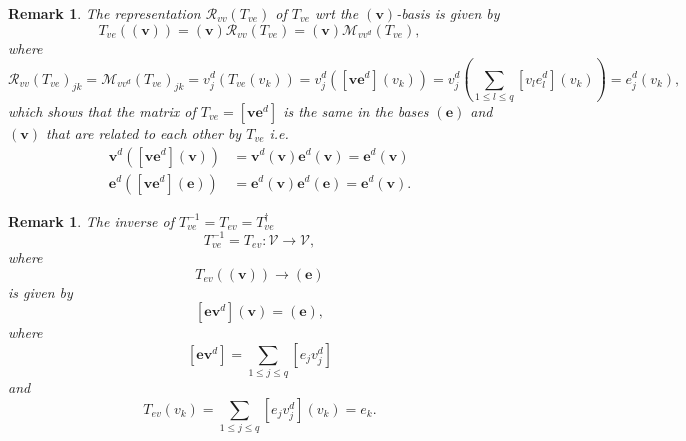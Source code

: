 \documentclass[aps,preprint]{revtex4}%
\newtheorem{remark}[theorem]{Remark}
\begin{document}
\begin{remark}
The representation $\mathcal{R}_{vv}\left(  T_{ve}\right)  $ of $T_{ve}$ wrt
the $\left(  \boldsymbol{v}\right)  $-basis is given by
\begin{equation}
T_{ve}\left(  \left(  \boldsymbol{v}\right)  \right)  =\left(  \boldsymbol{v}%
\right)  \mathcal{R}_{vv}\left(  T_{ve}\right)  =\left(  \boldsymbol{v}%
\right)  \mathcal{M}_{vv^{d}}\left(  T_{ve}\right)  ,
\end{equation}
where
\begin{equation}
\mathcal{R}_{vv}\left(  T_{ve}\right)  _{jk}=\mathcal{M}_{vv^{d}}\left(
T_{ve}\right)  _{jk}=v_{j}^{d}\left(  T_{ve}\left(  v_{k}\right)  \right)
=v_{j}^{d}\left(  \left[  \boldsymbol{v}\mathbf{e}^{d}\right]  \left(
v_{k}\right)  \right)  =v_{j}^{d}\left(  \sum_{1\leq l\leq q}\left[
v_{l}e_{l}^{d}\right]  \left(  v_{k}\right)  \right)  =e_{j}^{d}\left(
v_{k}\right)  ,
\end{equation}
which shows that the matrix of $T_{ve}=\left[  \boldsymbol{v}\mathbf{e}%
^{d}\right]  $ is the same in the bases $\left(  \mathbf{e}\right)  $ and
$\left(  \boldsymbol{v}\right)  $ that are related to each other by $T_{ve}$
i.e.%
\begin{align}
\boldsymbol{v}^{d}\left(  \left[  \boldsymbol{v}\mathbf{e}^{d}\right]  \left(
\boldsymbol{v}\right)  \right)   &  =\boldsymbol{v}^{d}\left(  \boldsymbol{v}%
\right)  \mathbf{e}^{d}\left(  \boldsymbol{v}\right)  =\mathbf{e}^{d}\left(
\boldsymbol{v}\right) \\
\mathbf{e}^{d}\left(  \left[  \boldsymbol{v}\mathbf{e}^{d}\right]  \left(
\mathbf{e}\right)  \right)   &  =\mathbf{e}^{d}\left(  \boldsymbol{v}\right)
\mathbf{e}^{d}\left(  \mathbf{e}\right)  =\mathbf{e}^{d}\left(  \boldsymbol{v}%
\right)  .
\end{align}

\end{remark}

\begin{remark}
The inverse of $T_{ve}^{-1}=T_{ev}=T_{ve}^{\dagger}$%
\begin{equation}
T_{ve}^{-1}=T_{ev}:\mathcal{V\rightarrow V},
\end{equation}
where
\begin{equation}
T_{ev}\left(  \left(  \boldsymbol{v}\right)  \right)  \rightarrow\left(
\mathbf{e}\right)
\end{equation}
is given by
\begin{equation}
\left[  \mathbf{e}\boldsymbol{v}^{d}\right]  \left(  \boldsymbol{v}\right)
=\left(  \mathbf{e}\right)  ,
\end{equation}
where
\begin{equation}
\left[  \mathbf{e}\boldsymbol{v}^{d}\right]  =\sum_{1\leq j\leq q}\left[
e_{j}v_{j}^{d}\right]
\end{equation}
and
\begin{equation}
T_{ev}\left(  v_{k}\right)  =\sum_{1\leq j\leq q}\left[  e_{j}v_{j}%
^{d}\right]  \left(  v_{k}\right)  =e_{k}.
\end{equation}

\end{remark}
\end{document}
